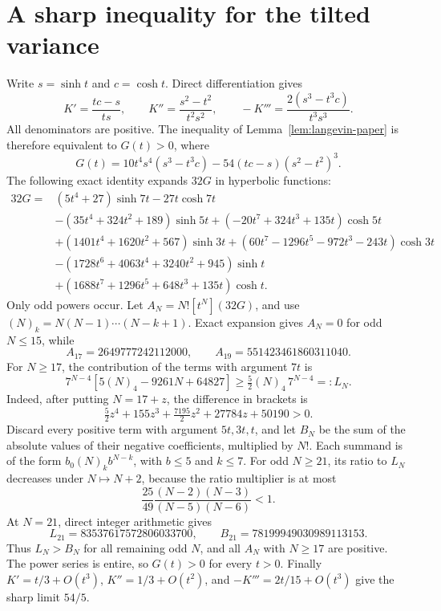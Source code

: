 \documentclass[11pt,a4paper]{article}
\theoremstyle{remark}\newtheorem{remark}[theorem]{Remark}
\begin{document}
\section{A sharp inequality for the tilted variance}\label{app:langevin-paper}
Write $s=\sinh t$ and $c=\cosh t$. Direct differentiation gives
\[
 K'=\frac{tc-s}{ts},\qquad K''=\frac{s^2-t^2}{t^2s^2},\qquad
 -K'''=\frac{2(s^3-t^3c)}{t^3s^3}.
\]
All denominators are positive. The inequality of
Lemma~\ref{lem:langevin-paper} is therefore equivalent to $G(t)>0$, where
\[
 G(t)=10t^4s^4(s^3-t^3c)-54(tc-s)(s^2-t^2)^3.
\]
The following exact identity expands $32G$ in hyperbolic functions:
\begin{align*}
32G={}&(5t^4+27)\sinh7t-27t\cosh7t\\
&-(35t^4+324t^2+189)\sinh5t
  +(-20t^7+324t^3+135t)\cosh5t\\
&+(1401t^4+1620t^2+567)\sinh3t
  +(60t^7-1296t^5-972t^3-243t)\cosh3t\\
&-(1728t^6+4063t^4+3240t^2+945)\sinh t\\
&+(1688t^7+1296t^5+648t^3+135t)\cosh t.
\end{align*}
Only odd powers occur. Let $A_N=N![t^N](32G)$, and use
$(N)_k=N(N-1)\cdots(N-k+1)$. Exact expansion gives $A_N=0$ for odd
$N\le15$, while
\[
 A_{17}=2649777242112000,\qquad
 A_{19}=551423461860311040.
\]
For $N\ge17$, the contribution of the terms with argument $7t$ is
\[
 7^{N-4}[5(N)_4-9261N+64827]
 \ge\tfrac52(N)_4\,7^{N-4}=:L_N.
\]
Indeed, after putting $N=17+z$, the difference in brackets is
\[
 \tfrac52z^4+155z^3+\tfrac{7195}{2}z^2+27784z+50190>0.
\]
Discard every positive term with argument $5t,3t,t$, and let $B_N$ be
the sum of the absolute values of their negative coefficients, multiplied
by $N!$. Each summand is of the form $b_0(N)_k b^{N-k}$, with
$b\le5$ and $k\le7$. For odd $N\ge21$, its ratio to $L_N$ decreases
under $N\mapsto N+2$, because the ratio multiplier is at most
\[
 \frac{25}{49}\frac{(N-2)(N-3)}{(N-5)(N-6)}<1.
\]
At $N=21$, direct integer arithmetic gives
\[
 L_{21}=83537617572806033700,
 \qquad B_{21}=78199949030989113153.
\]
Thus $L_N>B_N$ for all remaining odd $N$, and all $A_N$ with $N\ge17$
are positive. The power series is entire, so $G(t)>0$ for every $t>0$.
Finally $K'=t/3+O(t^3)$, $K''=1/3+O(t^2)$, and
$-K'''=2t/15+O(t^3)$ give the sharp limit $54/5$.
\end{document}
